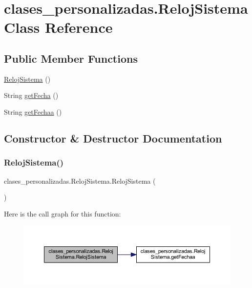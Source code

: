 \hypertarget{classclases__personalizadas_1_1_reloj_sistema}{}\section{clases\+\_\+personalizadas.\+Reloj\+Sistema Class Reference}
\label{classclases__personalizadas_1_1_reloj_sistema}
\subsection*{Public Member Functions}
\begin{DoxyCompactItemize}
\item 
\mbox{\hyperlink{classclases__personalizadas_1_1_reloj_sistema_a592c897a1a487b9cdfaa9054557a2045}{Reloj\+Sistema}} ()
\item 
String \mbox{\hyperlink{classclases__personalizadas_1_1_reloj_sistema_a24cad8ca53e9214a81dfb413f632ff57}{get\+Fecha}} ()
\item 
String \mbox{\hyperlink{classclases__personalizadas_1_1_reloj_sistema_a68dfd11750ec0a30be4646221c75e683}{get\+Fechaa}} ()
\end{DoxyCompactItemize}


\subsection{Constructor \& Destructor Documentation}
\mbox{\label{classclases__personalizadas_1_1_reloj_sistema_a592c897a1a487b9cdfaa9054557a2045}} 
\subsubsection{\texorpdfstring{Reloj\+Sistema()}{RelojSistema()}}
{\footnotesize\ttfamily clases\+\_\+personalizadas.\+Reloj\+Sistema.\+Reloj\+Sistema (\begin{DoxyParamCaption}{ }\end{DoxyParamCaption})}

Here is the call graph for this function\+:
\nopagebreak
\begin{figure}[H]
\begin{center}
\leavevmode
\includegraphics[width=350pt]{classclases__personalizadas_1_1_reloj_sistema_a592c897a1a487b9cdfaa9054557a2045_cgraph}
\end{center}
\end{figure}


